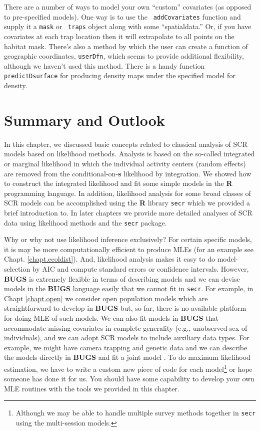 There are a number of ways to model your own ``custom'' covariates (as
opposed to pre-specified models).  One way is to use the \mbox{\tt
  addCovariates} function and supply it a \mbox{\tt mask} or \mbox{\tt
  traps} object along with some ``spatialdata.''  Or, if you have
covariates at each trap location then it will extrapolate to all
points on the habitat mask.  There's also a method by which the user
can create a function of geographic coordinates, \mbox{\tt userDfn},
which seems to provide additional flexibility, although we haven't
used this method.  There is a handy function \mbox{\tt
  predictDsurface} for producing density maps under the specified
model for density.




\section{Summary and Outlook}

In this chapter, we discussed basic concepts related to classical
analysis of SCR models based on likelihood methods. Analysis is based
on the so-called integrated or marginal likelihood in which the
individual activity centers (random effects) are removed from the
conditional-on-{\bf s} likelihood by integration. We showed how to
construct the integrated likelihood and fit some simple models in the
{\bf R} programming language.  In addition, likelihood analysis for
some broad classes of SCR models can be accomplished using the {\bf R}
library \mbox{\tt secr} \citep{efford:2011} which we provided a brief
introduction to. In later chapters we provide more detailed analyses
of SCR data using likelihood methods and the \mbox{\tt secr} package.

Why or why not use likelihood inference exclusively? For certain
specific models, it is may be more computationally efficient to
produce MLEs (for an example see Chapt. \ref{chapt.ecoldist}).  And,
likelihood analysis makes it easy to do model-selection by AIC and
compute standard errors or confidence intervals.  However, {\bf BUGS}
is extremely flexible in terms of describing models and
we can devise models in the {\bf
  BUGS} language easily that we cannot fit in \mbox{\tt secr}. For
example, in Chapt \ref{chapt.open} we consider open population models
which are straightforward to develop in {\bf BUGS} but, so far, there
is no available platform for doing MLE of such models.
We can also fit models in {\bf BUGS} that
accommodate missing covariates in complete generality (e.g.,
unobserved sex of individuals), and we can adopt SCR models to include
auxiliary data types. For example, we might have camera trapping and
genetic data and we can describe the models directly in {\bf BUGS} and
fit a joint model \citep{gopalaswamy_etal:2012ecol}. To do maximum
likelihood estimation, we 
have to write a custom new piece of code for each
model\footnote{Although we may be able to handle multiple survey
  methods together in \mbox{\tt secr} using the multi-session models.} or hope
someone has done it for us. You should have some capability to develop
your own MLE routines 
with the tools we provided in this chapter. 


